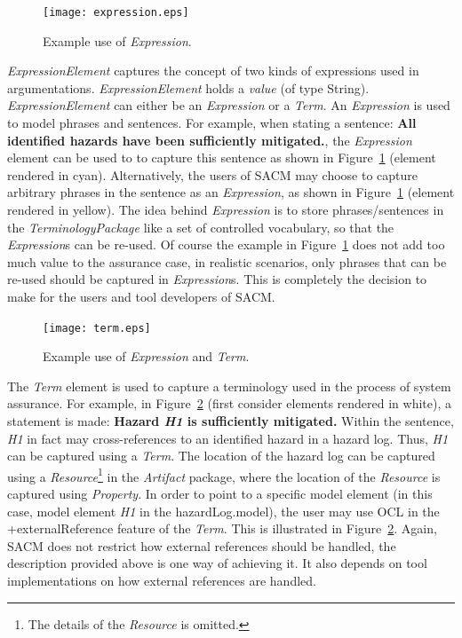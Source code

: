 \begin{figure}
	\centering
	\texttt{[image: expression.eps]}
	\caption{Example use of \textit{Expression}.}
	\label{fig:expression}
\end{figure}

\textit{ExpressionElement} captures the concept of two kinds of expressions used in argumentations. \textit{ExpressionElement} holds a \textit{value} (of type String). 
\textit{ExpressionElement} can either be an \textit{Expression} or a \textit{Term}. 
An \textit{Expression} is used to model phrases and sentences. 
For example, when stating a sentence: \textbf{All identified hazards have been sufficiently mitigated.}, the \textit{Expression} element can be used to to capture this sentence as shown in Figure~\ref{fig:expression} (element rendered in cyan). 
Alternatively, the users of SACM may choose to capture arbitrary phrases in the sentence as an \textit{Expression}, as shown in Figure~\ref{fig:expression} (element rendered in yellow). 
The idea behind \textit{Expression} is to store phrases/sentences in the \textit{TerminologyPackage} like a set of controlled vocabulary, so that the \textit{Expression}s can be re-used. 
Of course the example in Figure~\ref{fig:expression} does not add too much value to the assurance case, in realistic scenarios, only phrases that can be re-used should be captured in \textit{Expression}s. 
This is completely the decision to make for the users and tool developers of SACM. 

\begin{figure}
	\centering
	\texttt{[image: term.eps]}
	\caption{Example use of \textit{Expression} and \textit{Term}.}
	\label{fig:termExample}
\end{figure}

The \textit{Term} element is used to capture a terminology used in the process of system assurance. 
For example, in Figure~\ref{fig:termExample} (first consider elements rendered in white), a statement is made: \textbf{Hazard \textit{H1} is sufficiently mitigated.} 
Within the sentence, \textit{H1} in fact may cross-references to an identified hazard in a hazard log. 
Thus, \textit{H1} can be captured using a \textit{Term}. 
The location of the hazard log can be captured using a \textit{Resource}\footnote{The details of the \textit{Resource} is omitted.} in the \textit{Artifact} package, where the location of the \textit{Resource} is captured using \textit{Property}. 
In order to point to a specific model element (in this case, model element \textit{H1} in the hazardLog.model), the user may use OCL in the +externalReference feature of the \textit{Term}. 
This is illustrated in Figure~\ref{fig:termExample}.
Again, SACM does not restrict how external references should be handled, the description provided above is one way of achieving it. 
It also depends on tool implementations on how external references are handled. 

